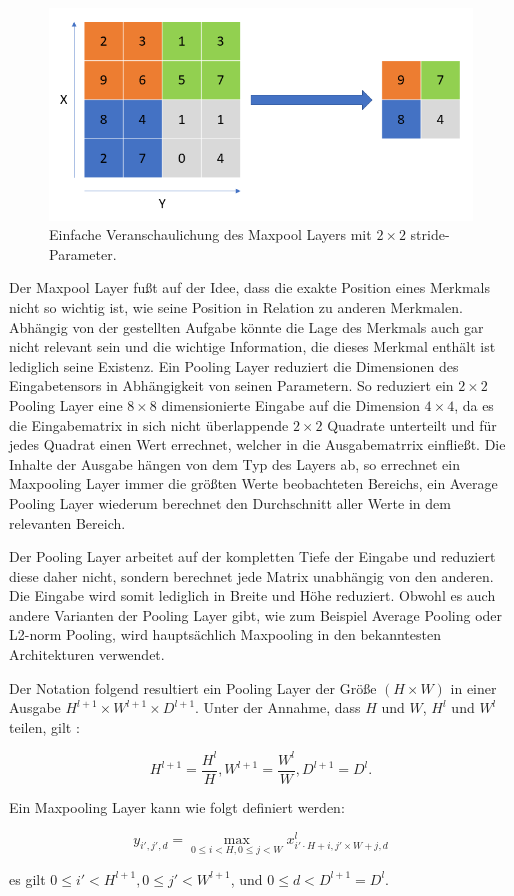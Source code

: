 \begin{figure}[H]
\centering
\includegraphics[scale=0.45]{pictures/grafiken/grafikenmax}
\caption[Caption for LOF]{Einfache Veranschaulichung des Maxpool Layers mit $2 \times 2$ stride-Parameter.}
\label{fig:maxpool}

\end{figure}

Der Maxpool Layer fußt auf der Idee, dass die exakte Position eines Merkmals nicht so wichtig ist, wie seine Position in Relation zu anderen Merkmalen. Abhängig von der gestellten Aufgabe könnte die Lage des Merkmals auch gar nicht relevant sein und die wichtige Information, die dieses Merkmal enthält ist lediglich seine Existenz. Ein Pooling Layer reduziert die Dimensionen des Eingabetensors in Abhängigkeit von seinen Parametern. So reduziert ein $2\times 2$ Pooling Layer eine $8\times8$ dimensionierte Eingabe auf die Dimension $4\times4$, da es die Eingabematrix in sich nicht überlappende $2\times2$ Quadrate unterteilt und f\"ur jedes Quadrat einen Wert errechnet, welcher in die Ausgabematrrix einflie\ss{}t. Die Inhalte der Ausgabe hängen von dem Typ des Layers ab, so errechnet ein Maxpooling Layer immer die größten Werte beobachteten Bereichs, ein Average Pooling Layer wiederum berechnet den Durchschnitt aller Werte in dem relevanten Bereich.

Der Pooling Layer arbeitet auf der kompletten Tiefe der Eingabe und reduziert diese daher nicht, sondern berechnet jede Matrix unabhängig von den anderen. Die Eingabe wird somit lediglich in Breite und Höhe reduziert. Obwohl es auch andere Varianten der Pooling Layer gibt, wie zum Beispiel Average Pooling oder L2-norm Pooling, wird hauptsächlich Maxpooling in den bekanntesten Architekturen verwendet.

Der Notation folgend resultiert ein Pooling Layer der Größe $(H \times W)$ in einer Ausgabe $H^{l+1} \times W^{l+1} \times D^{l+1}$. Unter der Annahme, dass $H$ und $W$, $H^l$ und $W^l$ teilen, gilt \parencite{Wu.2017}:

\begin{equation}
H^{l+1} = \frac{H^l}{H}, W^{l+1} = \frac{W^l}{W}, D^{l+1} = D^l.
\end{equation} 

Ein Maxpooling Layer kann wie folgt definiert werden:

\begin{equation}
y_{i', j', d} = \max_{0 \leq i<H, 0 \leq j <W} x^{l}_{i' \cdot H + i, j' \times W + j, d}
\end{equation}

es gilt $0 \leq i' < H^{l+1}, 0 \leq j' < W^{l+1}$, und $0 \leq d < D^{l+1} = D^l$.  
